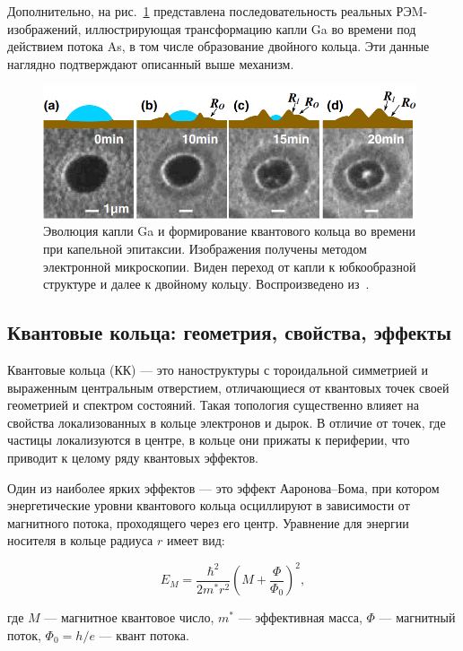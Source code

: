 \documentclass[14pt,oneside]{extarticle}
\begin{document}
Дополнительно, на рис.~\ref{fig:zhou1} представлена последовательность реальных РЭM-изображений, иллюстрирующая трансформацию капли Ga во времени под действием потока As, в том числе образование двойного кольца. Эти данные наглядно подтверждают описанный выше механизм.

\begin{figure}[H]
    \begin{center}
        \includegraphics[width=11cm]{images/Zhou1-Firgure1.png}
        \caption{\label{fig:zhou1}
            Эволюция капли Ga и формирование квантового кольца во времени при капельной эпитаксии. Изображения получены методом электронной микроскопии. Виден переход от капли к юбкообразной структуре и далее к двойному кольцу. Воспроизведено из~\cite{zhou2013}.}
    \end{center}
\end{figure}

\subsection{Квантовые кольца: геометрия, свойства, эффекты}

Квантовые кольца (КК) — это наноструктуры с тороидальной симметрией и выраженным центральным отверстием, отличающиеся от квантовых точек своей геометрией и спектром состояний. Такая топология существенно влияет на свойства локализованных в кольце электронов и дырок. В отличие от точек, где частицы локализуются в центре, в кольце они прижаты к периферии, что приводит к целому ряду квантовых эффектов.

Один из наиболее ярких эффектов — это эффект Ааронова–Бома, при котором энергетические уровни квантового кольца осциллируют в зависимости от магнитного потока, проходящего через его центр. Уравнение для энергии носителя в кольце радиуса $r$ имеет вид:

\[
E_M = \frac{\hbar^2}{2m^* r^2} \left( M + \frac{\Phi}{\Phi_0} \right)^2,
\]

где $M$ — магнитное квантовое число, $m^*$ — эффективная масса, $\Phi$ — магнитный поток, $\Phi_0 = h/e$ — квант потока.
\end{document}
